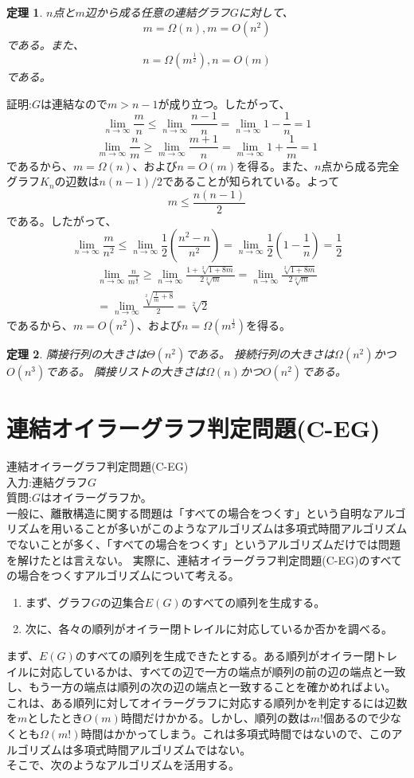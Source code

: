 \documentclass[twocolumn]{jarticle}
\newtheorem{tem}{定理}
\begin{document}
\begin{tem}
    $n$点と$m$辺から成る任意の連結グラフ$G$に対して、$$m=\Omega(n), m=O(n^2)$$である。また、$$n=\Omega(m^{\frac{1}{2}}), n=O(m)$$である。\\
\end{tem}
証明:$G$は連結なので$m>n-1$が成り立つ。したがって、
$$\lim_{n\rightarrow \infty}\frac{m}{n}\le \lim_{n\rightarrow \infty}\frac{n-1}{n} = \lim_{n\rightarrow \infty}{1-\frac{1}{n}} = 1$$
$$\lim_{m\rightarrow \infty}\frac{n}{m}\ge \lim_{m\rightarrow \infty}\frac{m+1}{n} = \lim_{m\rightarrow \infty}{1+\frac{1}{m}} = 1$$  
であるから、$m=\Omega(n)$、および$n=O(m)$を得る。また、$n$点から成る完全グラフ$K_n$の辺数は$n(n-1)/2$であることが知られている。よって
$$m\le\frac{n(n-1)}{2}$$
である。したがって、\newpage
$$\lim_{n\rightarrow \infty}\frac{m}{n^2}\le \lim_{n\rightarrow \infty}\frac{1}{2}{(\frac{n^2-n}{n^2})} = \lim_{n\rightarrow \infty}\frac{1}{2}{(1-\frac{1}{n})} = \frac{1}{2}$$
\begin{gather*}
        \lim_{n\rightarrow \infty}\frac{n}{m^{\frac{1}{2}}}\ge \lim_{n\rightarrow \infty}\frac{1+\sqrt[2]{1+8m}}{2\sqrt[2]{m}}=\lim_{n\rightarrow \infty}\frac{\sqrt[2]{1+8m}}{2\sqrt[2]{m}}\\ = \lim_{n\rightarrow \infty}\frac{\sqrt[2]{\frac{1}{m}+8}}{2} = \sqrt[2]{2} 
\end{gather*}
であるから、$m=O(n^2)$、および$n=\Omega(m^\frac{1}{2})$を得る。
\begin{tem}
    隣接行列の大きさは$\Theta(n^2)$である。
    接続行列の大きさは$\Omega(n^2)$かつ$O(n^3)$である。
    隣接リストの大きさは$\Omega(n)$かつ$O(n^2)$である。
\end{tem}

\section{連結オイラーグラフ判定問題(C-EG)}
\noindent 連結オイラーグラフ判定問題(C-EG)\\
入力:連結グラフ$G$\\
質問:$G$はオイラーグラフか。\\
一般に、離散構造に関する問題は「すべての場合をつくす」という自明なアルゴリズムを用いることが多いがこのようなアルゴリズムは多項式時間アルゴリズムでないことが多く、「すべての場合をつくす」というアルゴリズムだけでは問題を解けたとは言えない。
実際に、連結オイラーグラフ判定問題(C-EG)のすべての場合をつくすアルゴリズムについて考える。
\begin{enumerate}
    \item まず、グラフ$G$の辺集合$E(G)$のすべての順列を生成する。
    \item 次に、各々の順列がオイラー閉トレイルに対応しているか否かを調べる。
\end{enumerate}
まず、$E(G)$のすべての順列を生成できたとする。ある順列がオイラー閉トレイルに対応しているかは、すべての辺で一方の端点が順列の前の辺の端点と一致し、もう一方の端点は順列の次の辺の端点と一致することを確かめればよい。
これは、ある順列に対してオイラーグラフに対応する順列かを判定するには辺数を$m$としたとき$O(m)$時間だけかかる。しかし、順列の数は$m!$個あるので少なくとも$\Omega(m!)$時間はかかってしまう。これは多項式時間ではないので、このアルゴリズムは多項式時間アルゴリズムではない。\\
そこで、次のようなアルゴリズムを活用する。
\end{document}

